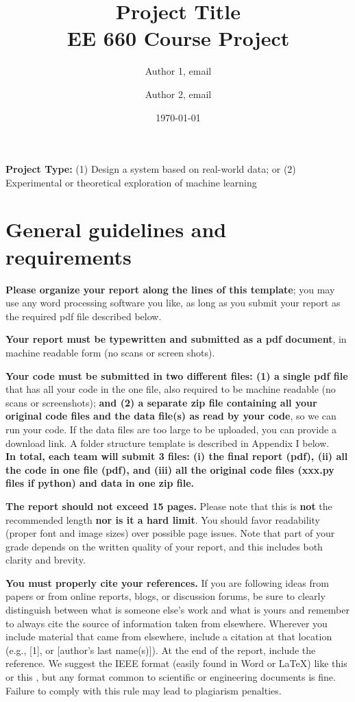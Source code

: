\documentclass[singlecolumn]{article}
\begin{document}
\title{Project Title\\
\large EE 660  Course Project}
\author{Author 1, email \and Author 2, email}
\date{\today}
\maketitle

\textbf{Project Type:} (1) Design a system based on real-world data; or (2) Experimental or theoretical exploration of machine learning 

\section*{General guidelines and requirements}

\textbf{Please organize your report along the lines of this template}; you may use any word processing software you like, as long as you submit your report as the required pdf file described below. 

\textbf{Your report must be typewritten and submitted as a pdf document}, in machine readable form (no scans or screen shots).

\textbf{Your code must be submitted in two different files: (1) a single pdf file} that has all your code in the one file, also required to be machine readable (no scans or screenshots);  \textbf{and (2) a separate zip file containing all your original code files and the data file(s) as read by your code}, so we can run your code. If the data files are too large to be uploaded, you can provide a download link. A folder structure template is described in Appendix I below. \\ 
\textbf{In total, each team will submit 3 files:  (i) the final report (pdf), (ii) all the code in one file (pdf), and (iii) all the original code files (xxx.py files if python) and data in one zip file. }
 
\textbf{The report should not exceed 15 pages.} Please note that this is \textbf{not} the recommended length \textbf{nor is it a hard limit}. You should favor readability (proper font and image sizes) over possible page issues. Note that part of your grade depends on the written quality of your report, and this includes both clarity and brevity.

\textbf{You must properly cite your references.} If you are following ideas from papers or from online reports, blogs, or discussion forums, be sure to clearly distinguish between what is someone else’s work and what is yours and remember to always cite the source of information taken from elsewhere. Wherever you include material that came from elsewhere, include a citation at that location (e.g., [1], or [author’s last name(s)]). At the end of the report, include the reference. We suggest the IEEE format (easily found in Word or \LaTeX) like this \cite{latexReferencing} or this \cite{samplePaper}, but any format common to scientific or engineering documents is fine. Failure to comply with this rule may lead to plagiarism penalties. 
\end{document}
